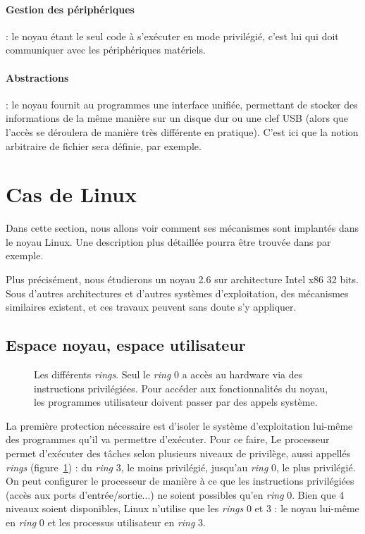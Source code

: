 \paragraph{Gestion des périphériques} : le noyau étant le seul code à s'exécuter
en mode privilégié, c'est lui qui doit communiquer avec les périphériques
matériels.

\paragraph{Abstractions} : le noyau fournit au programmes une interface unifiée,
permettant de stocker des informations de la même manière sur un disque dur ou
une clef USB (alors que l'accès se déroulera de manière très différente en
pratique). C'est ici que la notion arbitraire de fichier sera définie, par
exemple.

\section{Cas de Linux}

Dans cette section, nous allons voir comment ses mécanismes sont implantés dans
le noyau Linux. Une description plus détaillée pourra être trouvée dans
\cite{UnderstandingTheLinuxKernel} par exemple.

Plus précisément, nous étudierons un noyau 2.6 sur architecture Intel x86 32
bits. Sous d'autres architectures et d'autres systèmes d'exploitation, des
mécanismes similaires existent, et ces travaux peuvent sans doute s'y appliquer.

\subsection{Espace noyau, espace utilisateur}

\begin{figure}

\caption{Les différents \emph{rings}. Seul le \emph{ring} 0 a accès au hardware
via des instructions privilégiées. Pour accéder aux fonctionnalités du noyau,
les programmes utilisateur doivent passer par des appels système.}
\label{fig:rings}
\end{figure}

La première protection nécessaire est d'isoler le système d'exploitation
lui-même des programmes qu'il va permettre d'exécuter. Pour ce faire, Le
processeur permet d'exécuter des tâches selon plusieurs niveaux de privilège,
aussi appellés \emph{rings} (figure~\ref{fig:rings}) : du \emph{ring} 3, le
moins privilégié, jusqu'au \emph{ring} 0, le plus privilégié. On peut configurer
le processeur de manière à ce que les instructions privilégiées (accès aux ports
d'entrée/sortie...) ne soient possibles qu'en \emph{ring} 0. Bien que 4 niveaux
soient disponibles, Linux n'utilise que les \emph{rings} 0 et 3 : le noyau
lui-même en \emph{ring} 0 et les processus utilisateur en \emph{ring} 3.

